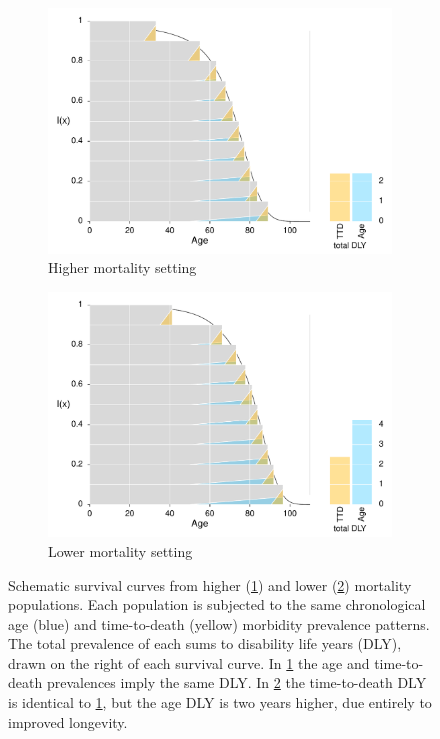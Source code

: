 \documentclass[11pt,oneside,a4paper]{article} %
\begin{document}
\begin{figure}
\centering
\begin{subfigure}{.5\textwidth}
  \centering
  \includegraphics[width=.98\linewidth]{Figures/Japan1970}
  \caption{Higher mortality setting}
  \label{fig:toypop1}
\end{subfigure}%
\begin{subfigure}{.5\textwidth}
  \centering
  \includegraphics[width=.98\linewidth]{Figures/Japan2010}
  \caption{Lower mortality setting}
  \label{fig:toypop2}
\end{subfigure}
\caption{Schematic survival curves from higher (\ref{fig:toypop1}) and lower
(\ref{fig:toypop2}) mortality populations. Each population is
subjected to the same chronological age (blue) and time-to-death (yellow)
morbidity prevalence patterns. The total prevalence of each sums to disability life years
(DLY), drawn on the right of each survival curve. In \ref{fig:toypop1}
the age and time-to-death prevalences imply the same DLY. In
\ref{fig:toypop2} the time-to-death DLY is identical to \ref{fig:toypop1}, but
the age DLY is two years higher, due entirely to improved longevity.}
\label{fig:test}
\end{figure}
\end{document}
